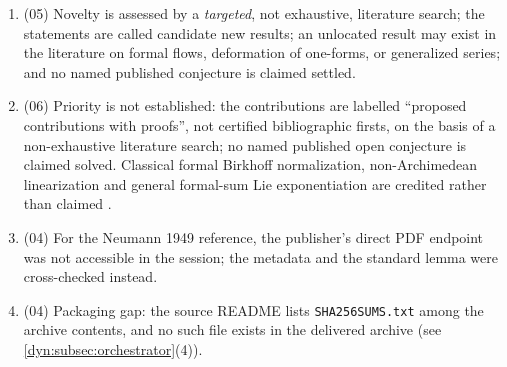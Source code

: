 \documentclass[11pt,letterpaper]{article}
\theoremstyle{definition}
\theoremstyle{remark}
\numberwithin{equation}{section}
\begin{document}
\begin{enumerate}[label=\textbf{N\arabic*.},leftmargin=3.2em,start=7]
exhaustive line-by-line audit'' at one frozen revision.
\item (05) Novelty is assessed by a \emph{targeted}, not exhaustive,
literature search; the statements are called candidate new results; an
unlocated result may exist in the literature on formal flows, deformation
of one-forms, or generalized series; and no named published conjecture is
claimed settled.
\item (06) Priority is not established: the contributions are labelled
``proposed contributions with proofs'', not certified bibliographic firsts,
on the basis of a non-exhaustive literature search; no named published open
conjecture is claimed solved. Classical formal Birkhoff normalization,
non-Archimedean linearization and general formal-sum Lie exponentiation are
credited rather than claimed
\cite{PerezMarco,Krikorian,Lindahl,BKKPS}.
\item (04) For the Neumann 1949 reference, the publisher's direct PDF
endpoint was not accessible in the session; the metadata and the standard
lemma were cross-checked instead.
\item (04) Packaging gap: the source README lists \texttt{SHA256SUMS.txt}
among the archive contents, and no such file exists in the delivered
archive (see \cref{dyn:subsec:orchestrator}(4)).
\end{enumerate}
\end{document}
